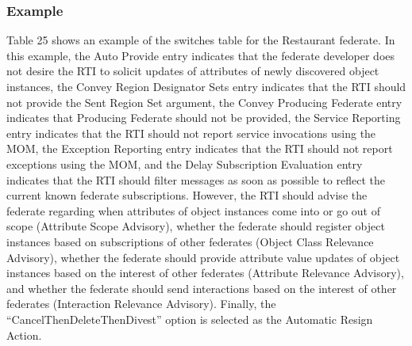 \subsubsection{Example}
Table 25 shows an example of the switches table for the Restaurant federate. In this example, the Auto Provide entry indicates that the federate developer does not desire the RTI to solicit updates of attributes of newly discovered object instances, the Convey Region Designator Sets entry indicates that the RTI should not provide the Sent Region Set argument, the Convey Producing Federate entry indicates that Producing Federate should not be provided, the Service Reporting entry indicates that the RTI should not report service invocations using the MOM, the Exception Reporting entry indicates that the RTI should not report exceptions using the MOM, and the Delay Subscription Evaluation entry indicates that the RTI should filter messages as soon as possible to reflect the current known federate subscriptions. However, the RTI should advise the federate regarding when attributes of object instances come into or go out of scope (Attribute Scope Advisory), whether the federate should register object instances based on subscriptions of other federates (Object Class Relevance Advisory), whether the federate should provide attribute value updates of object instances based on the interest of other federates (Attribute Relevance Advisory), and whether the federate should send interactions based on the interest of other federates (Interaction Relevance Advisory). Finally, the ``CancelThenDeleteThenDivest'' option is selected as the Automatic Resign Action.

